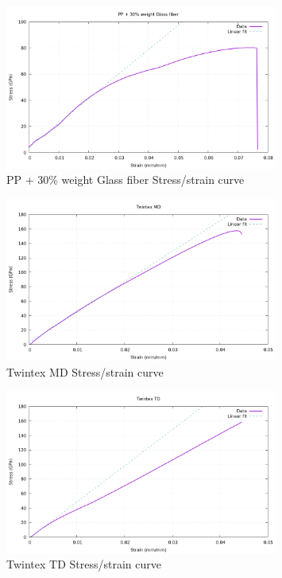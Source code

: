 \begin{figure}[H]
	\centering
	\includegraphics[width=0.8\textwidth]{img/PP30.png}
	\caption{PP + 30\% weight Glass fiber Stress/strain curve}
	\label{fig:pp30}
\end{figure}

\begin{figure}[H]
	\centering
	\includegraphics[width=0.8\textwidth]{img/twintex_MD.png}
	\caption{Twintex MD Stress/strain curve}
	\label{fig:twintex_MD}
\end{figure}

\begin{figure}[H]
	\centering
	\includegraphics[width=0.8\textwidth]{img/twintex_TD.png}
	\caption{Twintex TD Stress/strain curve}
	\label{fig:twintex_TD}
\end{figure}


